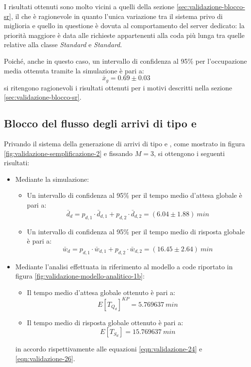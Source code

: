 I risultati ottenuti sono molto vicini a quelli della sezione \ref{sec:validazione-blocco-sr}, il che è ragionevole in quanto l'unica variazione tra il sistema privo di miglioria e quello in questione è dovuta al comportamento del server dedicato: la priorità maggiore è data alle richieste appartenenti alla coda più lunga tra quelle relative alla classe \uo{} \textsl{Standard} e \pp{} \textsl{Standard}.

Poiché, anche in questo caso, un intervallo di confidenza al 95\% per l'occupazione media ottenuta tramite la simulazione è pari a:
\begin{equation}
\bar{x}_g = 0.69 \pm 0.03
\end{equation}
si ritengono ragionevoli i risultati ottenuti per i motivi descritti nella sezione \ref{sec:validazione-blocco-sr}.

\subsection{Blocco del flusso degli arrivi di tipo \uo{} e \pp{}}
Privando il sistema della generazione di arrivi di tipo \uo{} e \pp{}, come mostrato in figura \ref{fig:validazione-semplificazione-2} e fissando $M = 3$, si ottengono i seguenti risultati:
\begin{itemize}
\item Mediante la simulazione:
\begin{itemize}
\item Un intervallo di confidenza al 95\% per il tempo medio d'attesa globale è pari a:
\begin{equation} 
\bar{d}_d = p_{d,1}\cdot \bar{d}_{d,1} + p_{d,2}\cdot \bar{d}_{d,2} = (6.04 \pm 1.88)\ min
\end{equation}
\item Un intervallo di confidenza al 95\% per il tempo medio di risposta globale è pari a:
\begin{equation}
\bar{w}_d = p_{d,1}\cdot \bar{w}_{d,1} + p_{d,2}\cdot \bar{w}_{d,2} = (16.45 \pm 2.64)\ min
\end{equation}
\end{itemize}

\item Mediante l'analisi effettuata in riferimento al modello a code riportato in figura \ref{fig:validazione-modello-analitico-1b}:
\begin{itemize}
\item Il tempo medio d'attesa globale ottenuto è pari a:
\begin{equation}
E[T_{Q_d}]^{KP} = 5.769637\ min 
\end{equation}
\item Il tempo medio di risposta globale ottenuto è pari a:
\begin{equation}
E[T_{S_d}] = 15.769637\ min 
\end{equation}
\end{itemize}
in accordo rispettivamente alle equazioni \ref{eqn:validazione-24} e \ref{eqn:validazione-26}.
\end{itemize}

